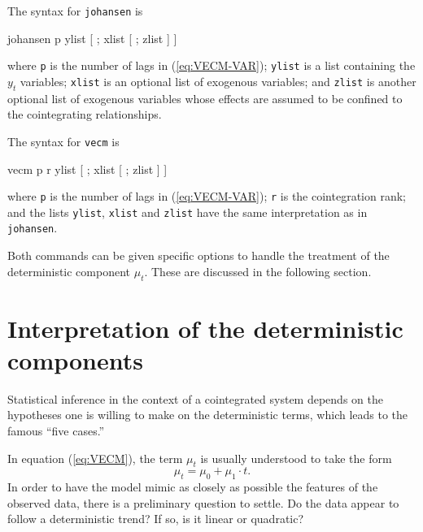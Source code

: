 The syntax for \texttt{johansen} is
\begin{code}
  johansen p ylist [ ; xlist [ ; zlist ] ]
\end{code}
where \texttt{p} is the number of lags in (\ref{eq:VECM-VAR});
\texttt{ylist} is a list containing the $y_t$ variables;
\texttt{xlist} is an optional list of exogenous variables; and
\texttt{zlist} is another optional list of exogenous variables whose
effects are assumed to be confined to the cointegrating relationships.

The syntax for \texttt{vecm} is 
\begin{code}
  vecm p r ylist [ ; xlist [ ; zlist ] ]
\end{code}
where \texttt{p} is the number of lags in (\ref{eq:VECM-VAR});
\texttt{r} is the cointegration rank; and the lists
\texttt{ylist}, \texttt{xlist} and \texttt{zlist} have the
same interpretation as in \texttt{johansen}.

Both commands can be given specific options to handle the treatment of
the deterministic component $\mu_t$. These are discussed in the
following section.

\section{Interpretation of the deterministic components}
\label{sec:coint-5cases}

Statistical inference in the context of a cointegrated system depends
on the hypotheses one is willing to make on the deterministic terms,
which leads to the famous ``five cases.''

In equation (\ref{eq:VECM}), the term $\mu_t$ is usually understood to
take the form
\[
  \mu_t = \mu_0 + \mu_1 \cdot t .
\]
In order to have the model mimic as closely as possible the features
of the observed data, there is a preliminary question to settle. Do
the data appear to follow a deterministic trend?  If so, is it
linear or quadratic?

